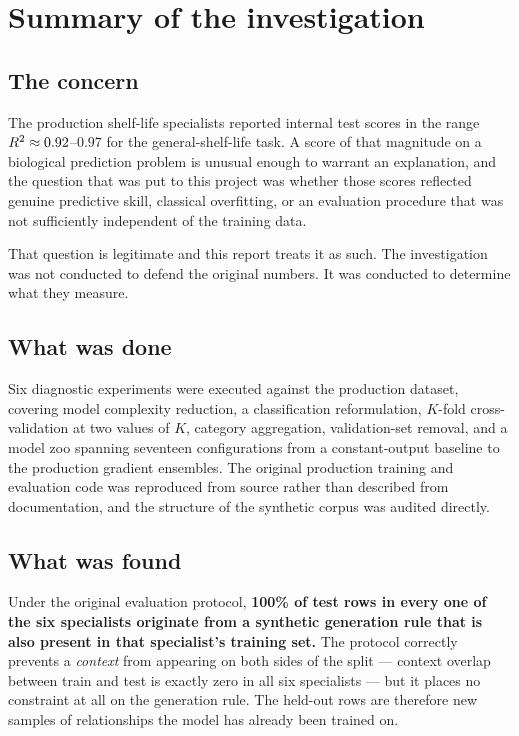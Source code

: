 \chapter*{Summary of the investigation}

\section*{The concern}

The production shelf-life specialists reported internal test scores in the
range $R^2 \approx 0.92$--$0.97$ for the general-shelf-life task. A score
of that magnitude on a biological prediction problem is unusual enough to
warrant an explanation, and the question that was put to this project was
whether those scores reflected genuine predictive skill, classical
overfitting, or an evaluation procedure that was not sufficiently
independent of the training data.

That question is legitimate and this report treats it as such. The
investigation was not conducted to defend the original numbers. It was
conducted to determine what they measure.

\section*{What was done}

Six diagnostic experiments were executed against the production dataset,
covering model complexity reduction, a classification reformulation,
$K$-fold cross-validation at two values of $K$, category aggregation,
validation-set removal, and a model zoo spanning seventeen
configurations from a constant-output baseline to the production gradient
ensembles. The original production training and evaluation code was
reproduced from source rather than described from documentation, and the
structure of the synthetic corpus was audited directly.

\section*{What was found}

\begin{findingbox}[title=The central result]
Under the original evaluation protocol, \textbf{100\% of test rows in
every one of the six specialists originate from a synthetic generation
rule that is also present in that specialist's training set.} The
protocol correctly prevents a \emph{context} from appearing on both sides
of the split --- context overlap between train and test is exactly zero in
all six specialists --- but it places no constraint at all on the
generation rule. The held-out rows are therefore new samples of
relationships the model has already been trained on.
\end{findingbox}

